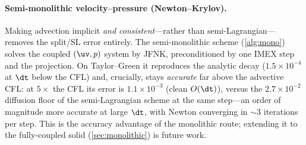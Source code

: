 \paragraph{Semi-monolithic velocity--pressure (Newton--Krylov).} Making advection
implicit \emph{and consistent}---rather than semi-Lagrangian---removes the split/SL error
entirely. The semi-monolithic scheme (\cref{alg:mono}) solves the coupled $(\uv,p)$ system
by JFNK, preconditioned by one IMEX step and the projection. On Taylor--Green it reproduces
the analytic decay ($1.5\times10^{-4}$ at $\dt$ below the CFL) and, crucially, stays
\emph{accurate} far above the advective CFL: at $5\times$ the CFL its error is
$1.1\times10^{-3}$ (clean $O(\dt)$), versus the $2.7\times10^{-2}$ diffusion floor of the
semi-Lagrangian scheme at the same step---an order of magnitude more accurate at large
$\dt$, with Newton converging in ${\sim}3$ iterations per step. This is the accuracy
advantage of the monolithic route; extending it to the fully-coupled solid
(\cref{sec:monolithic}) is future work.
